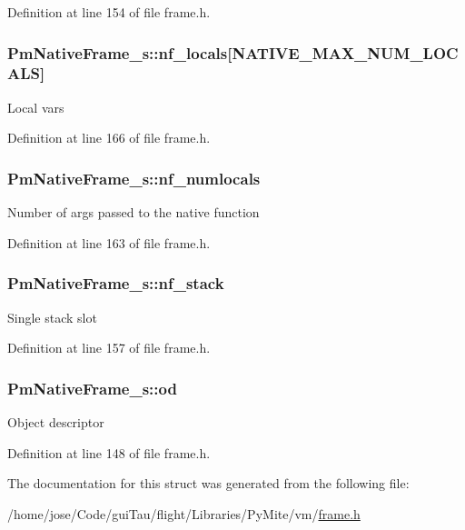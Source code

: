 Definition at line 154 of file frame.\-h.

\hypertarget{struct_pm_native_frame__s_a36830bf12c15b6648e1fa3a1062d195a}{
\subsubsection[{nf\-\_\-locals}]{ Pm\-Native\-Frame\-\_\-s\-::nf\-\_\-locals\mbox{[}N\-A\-T\-I\-V\-E\-\_\-\-M\-A\-X\-\_\-\-N\-U\-M\-\_\-\-L\-O\-C\-A\-L\-S\mbox{]}}}\label{struct_pm_native_frame__s_a36830bf12c15b6648e1fa3a1062d195a}
Local vars 

Definition at line 166 of file frame.\-h.

\hypertarget{struct_pm_native_frame__s_a939bbde4c57f7cca11a1a41b1dac403a}{
\subsubsection[{nf\-\_\-numlocals}]{ Pm\-Native\-Frame\-\_\-s\-::nf\-\_\-numlocals}}\label{struct_pm_native_frame__s_a939bbde4c57f7cca11a1a41b1dac403a}
Number of args passed to the native function 

Definition at line 163 of file frame.\-h.

\hypertarget{struct_pm_native_frame__s_a1d1c89f138be82be6c1a7a2bfa3929c7}{
\subsubsection[{nf\-\_\-stack}]{ Pm\-Native\-Frame\-\_\-s\-::nf\-\_\-stack}}\label{struct_pm_native_frame__s_a1d1c89f138be82be6c1a7a2bfa3929c7}
Single stack slot 

Definition at line 157 of file frame.\-h.

\hypertarget{struct_pm_native_frame__s_ac90b65bc6739e3a23db5a3f14ca022c0}{
\subsubsection[{od}]{ Pm\-Native\-Frame\-\_\-s\-::od}}\label{struct_pm_native_frame__s_ac90b65bc6739e3a23db5a3f14ca022c0}
Object descriptor 

Definition at line 148 of file frame.\-h.



The documentation for this struct was generated from the following file\-:\begin{DoxyCompactItemize}
\item 
/home/jose/\-Code/gui\-Tau/flight/\-Libraries/\-Py\-Mite/vm/\hyperlink{frame_8h}{frame.\-h}\end{DoxyCompactItemize}

